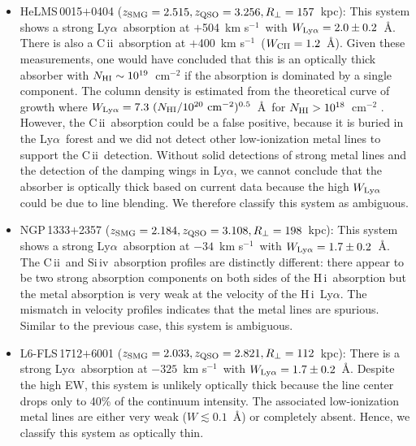 \documentclass[iop,revtex4,twocolumn,apj,numberedappendix,appendixfloats]{emulateapj}
\newcommand{\kms}{{km s$^{-1}$}}
\newcommand{\lya}{Ly$\alpha$}
\newcommand{\HI}{H\,{\sc i}}
\newcommand{\CII}{C\,{\sc ii}}
\newcommand{\SiIV}{Si\,{\sc iv}}
\begin{document}
\begin{itemize}
\item HeLMS\,0015$+$0404 ($z_{\rm SMG} = 2.515, z_{\rm QSO} = 3.256, R_\bot = 157$~kpc): This system shows a strong \lya\ absorption at $+$504~\kms\ with $W_{\rm Ly\alpha} = 2.0\pm0.2$~\AA. There is also a \CII\ absorption at $+$400~\kms\ ($W_{\rm CII} = 1.2$~\AA). Given these measurements, one would have concluded that this is an optically thick absorber with $N_{\rm HI} \sim 10^{19}$~cm$^{-2}$ if the absorption is dominated by a single component. The column density is estimated from the theoretical curve of growth where $W_{\rm Ly\alpha} = 7.3~(N_{\rm HI}/10^{20}~{\rm cm}^{-2})^{0.5}$~\AA\ for $N_{\rm HI} > 10^{18}$~cm$^{-2}$ \citep[][\S16.4.4]{Mo10}. However, the \CII\ absorption could be a false positive, because it is buried in the \lya\ forest and we did not detect other low-ionization metal lines to support the \CII\ detection. 
Without solid detections of strong metal lines and the detection of the damping wings in \lya, we cannot conclude that the absorber is optically thick based on current data because the high $W_{\rm Ly\alpha}$ could be due to line blending. We therefore classify this system as ambiguous. 

\item NGP\,1333$+$2357 ($z_{\rm SMG} = 2.184, z_{\rm QSO} = 3.108, R_\bot = 198$~kpc): This system shows a strong \lya\ absorption at $-34$~\kms\ with $W_{\rm Ly\alpha} = 1.7\pm0.2$~\AA. The \CII\ and \SiIV\ absorption profiles are distinctly different: there appear to be two strong absorption components on both sides of the \HI\ absorption but the metal absorption is very weak at the velocity of the \HI\ \lya. The mismatch in velocity profiles indicates that the metal lines are spurious. Similar to the previous case, this system is ambiguous. 

\item L6-FLS\,1712$+$6001 ($z_{\rm SMG} = 2.033, z_{\rm QSO} = 2.821, R_\bot = 112$~kpc): There is a strong \lya\ absorption at $-325$~\kms\ with $W_{\rm Ly\alpha} = 1.7\pm0.2$~\AA. Despite the high EW, this system is unlikely optically thick because the line center drops only to 40\% of the continuum intensity. The associated low-ionization metal lines are either very weak ($W \lesssim 0.1$~\AA) or completely absent. Hence, we classify this system as optically thin.

\end{itemize}
\end{document}
